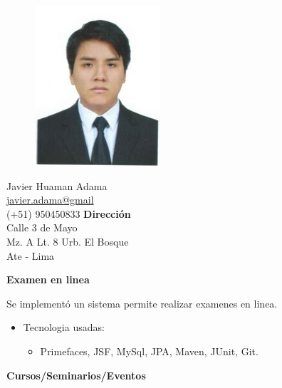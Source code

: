 \documentclass[a4paper,12pt,final]{memoir}
\newcommand{\Sep}{\vspace{1.5em}}
\newcommand{\SmallSep}{\vspace{0.5em}}
\newcommand{\CVSection}[1]
	{\Large\textbf{#1}\par
	\SmallSep\normalsize\normalfont}
\newcommand{\CVItem}[1]
	{\textbf{\color{RoyalBlue} #1}}
\begin{document}
\begin{figure}
	\hfill
	\includegraphics[width=0.6\columnwidth]{profile}
	\vspace{-7cm}
\end{figure}

\begin{flushright}\small
	Javier Huaman Adama \\
	\url{javier.adama@gmail}  \\
	(+51) 950450833
	\Sep
	\textbf{Dirección} \\
	Calle 3 de Mayo \\ %
	Mz. A Lt. 8 Urb. El Bosque \\ %
	Ate - Lima \\ %
\end{flushright}\normalsize
\framebreak

\CVItem{Examen en linea}{
Se implementó un sistema permite realizar examenes en linea.
\begin{itemize}[noitemsep]
  \item Tecnologia usadas:
  \begin{itemize}
    \item Primefaces, JSF, MySql, JPA, Maven, JUnit, Git.
  \end{itemize}
\end{itemize}
}


\Sep %


\CVSection{Cursos/Seminarios/Eventos}
\end{document}
